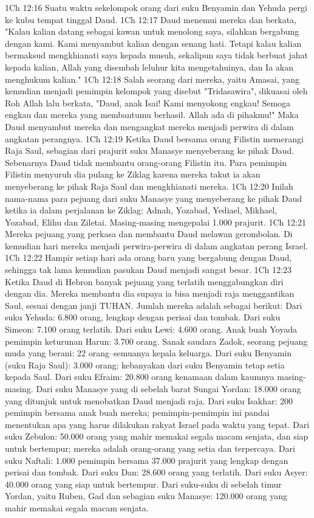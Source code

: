1Ch 12:16  Suatu waktu sekelompok orang dari suku Benyamin dan Yehuda pergi ke kubu tempat tinggal Daud.
1Ch 12:17  Daud menemui mereka dan berkata, "Kalau kalian datang sebagai kawan untuk menolong saya, silahkan bergabung dengan kami. Kami menyambut kalian dengan senang hati. Tetapi kalau kalian bermaksud mengkhianati saya kepada musuh, sekalipun saya tidak berbuat jahat kepada kalian, Allah yang disembah leluhur kita mengetahuinya, dan Ia akan menghukum kalian."
1Ch 12:18  Salah seorang dari mereka, yaitu Amasai, yang kemudian menjadi pemimpin kelompok yang disebut "Tridasawira", dikuasai oleh Roh Allah lalu berkata, "Daud, anak Isai! Kami menyokong engkau! Semoga engkau dan mereka yang membantumu berhasil. Allah ada di pihakmu!" Maka Daud menyambut mereka dan mengangkat mereka menjadi perwira di dalam angkatan perangnya.
1Ch 12:19  Ketika Daud bersama orang Filistin memerangi Raja Saul, sebagian dari prajurit suku Manasye menyeberang ke pihak Daud. Sebenarnya Daud tidak membantu orang-orang Filistin itu. Para pemimpin Filistin menyuruh dia pulang ke Ziklag karena mereka takut ia akan menyeberang ke pihak Raja Saul dan mengkhianati mereka.
1Ch 12:20  Inilah nama-nama para pejuang dari suku Manasye yang menyeberang ke pihak Daud ketika ia dalam perjalanan ke Ziklag: Adnah, Yozabad, Yediael, Mikhael, Yozabad, Elihu dan Ziletai. Masing-masing mengepalai 1.000 prajurit.
1Ch 12:21  Mereka pejuang yang perkasa dan membantu Daud melawan gerombolan. Di kemudian hari mereka menjadi perwira-perwira di dalam angkatan perang Israel.
1Ch 12:22  Hampir setiap hari ada orang baru yang bergabung dengan Daud, sehingga tak lama kemudian pasukan Daud menjadi sangat besar.
1Ch 12:23  Ketika Daud di Hebron banyak pejuang yang terlatih menggabungkan diri dengan dia. Mereka membantu dia supaya ia bisa menjadi raja menggantikan Saul, sesuai dengan janji TUHAN. Jumlah mereka adalah sebagai berikut: Dari suku Yehuda: 6.800 orang, lengkap dengan perisai dan tombak. Dari suku Simeon: 7.100 orang terlatih. Dari suku Lewi: 4.600 orang. Anak buah Yoyada pemimpin keturunan Harun: 3.700 orang. Sanak saudara Zadok, seorang pejuang muda yang berani: 22 orang--semuanya kepala keluarga. Dari suku Benyamin (suku Raja Saul): 3.000 orang; kebanyakan dari suku Benyamin tetap setia kepada Saul. Dari suku Efraim: 20.800 orang kenamaan dalam kaumnya masing-masing. Dari suku Manasye yang di sebelah barat Sungai Yordan: 18.000 orang yang ditunjuk untuk menobatkan Daud menjadi raja. Dari suku Isakhar: 200 pemimpin bersama anak buah mereka; pemimpin-pemimpin ini pandai menentukan apa yang harus dilakukan rakyat Israel pada waktu yang tepat. Dari suku Zebulon: 50.000 orang yang mahir memakai segala macam senjata, dan siap untuk bertempur; mereka adalah orang-orang yang setia dan terpercaya. Dari suku Naftali: 1.000 pemimpin bersama 37.000 prajurit yang lengkap dengan perisai dan tombak. Dari suku Dan: 28.600 orang yang terlatih. Dari suku Asyer: 40.000 orang yang siap untuk bertempur. Dari suku-suku di sebelah timur Yordan, yaitu Ruben, Gad dan sebagian suku Manasye: 120.000 orang yang mahir memakai segala macam senjata.
